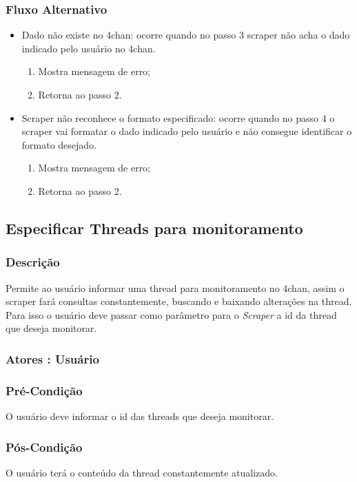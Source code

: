 \subsubsection{Fluxo Alternativo}
\begin{itemize}
    \item Dado não existe no 4chan: ocorre quando no passo 3 scraper não acha o dado indicado pelo usuário no 4chan.
    \begin{enumerate}
        \item Mostra mensagem de erro;
        \item Retorna ao passo 2.
    \end{enumerate}
    \item Scraper não reconhece o formato especificado: ocorre quando no passo 4 o scraper vai formatar o dado indicado pelo usuário e não consegue identificar o formato desejado.
    \begin{enumerate}
        \item Mostra mensagem de erro;
        \item Retorna ao passo 2.
    \end{enumerate}
\end{itemize}


\subsection{Especificar Threads para monitoramento}
\subsubsection{Descrição}
Permite ao usuário informar uma thread para monitoramento no 4chan, assim o scraper fará consultas constantemente, buscando e baixando alterações na thread. Para isso o usuário deve passar como parâmetro para o \textit{Scraper} a id da thread que deseja monitorar. 
\subsubsection{Atores : Usuário}
\subsubsection{Pré-Condição}
O usuário deve informar o id das threads que deseja monitorar.
\subsubsection{Pós-Condição}
O usuário terá o conteúdo da thread constantemente atualizado.

